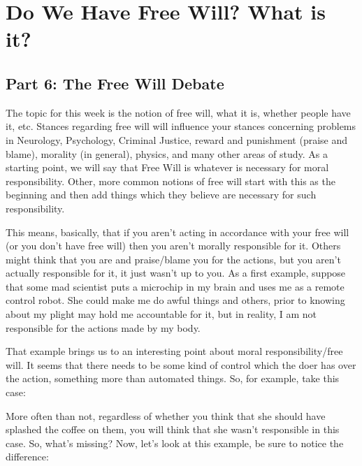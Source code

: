 \part{Do We Have Free Will? What is it?}
\label{ch.modFour}
\chapter{Part 6: The Free Will Debate}
The topic for this week is the notion of free will, what it is, whether people have it, etc. Stances regarding free will will influence your stances concerning problems in Neurology, Psychology, Criminal Justice, reward and punishment (praise and blame), morality (in general), physics, and many other areas of study. As a starting point, we will say that Free Will is whatever is necessary for moral responsibility. Other, more common notions of free will start with this as the beginning and then add things which they believe are necessary for such responsibility. 

This means, basically, that if you aren't acting in accordance with your free will (or you don't have free will) then you aren't morally responsible for it. Others might think that you are and praise/blame you for the actions, but you aren't actually responsible for it, it just wasn't up to you. As a first example, suppose that some mad scientist puts a microchip in my brain and uses me as a remote control robot. She could make me do awful things and others, prior to knowing about my plight may hold me accountable for it, but in reality, I am not responsible for the actions made by my body. 

That example brings us to an interesting point about moral responsibility/free will. It seems that there needs to be some kind of control which the doer has over the action, something more than automated things. So, for example, take this case:


More often than not, regardless of whether you think that she should have splashed the coffee on them, you will think that she wasn't responsible in this case. So, what's missing? Now, let's look at this example, be sure to notice the difference:

